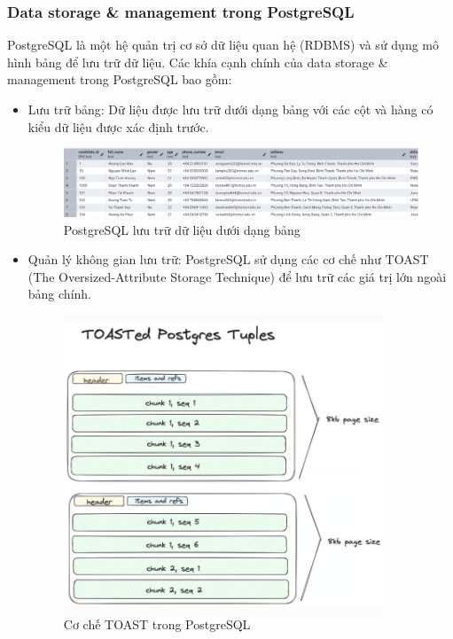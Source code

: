 \subsubsection{Data storage \& management trong PostgreSQL}
\indent PostgreSQL là một hệ quản trị cơ sở dữ liệu quan hệ (RDBMS) và sử dụng mô hình bảng để lưu trữ dữ liệu. Các khía cạnh chính của data storage \& management trong PostgreSQL bao gồm:
\begin{itemize}
    \item Lưu trữ bảng: Dữ liệu được lưu trữ dưới dạng bảng với các cột và hàng có kiểu dữ liệu được xác định trước. 
    \begin{figure}[H]
        \centering
        \includegraphics[width=\textwidth]{Image/2.1.2a.png}
        \caption{PostgreSQL lưu trữ dữ liệu dưới dạng bảng}
    \end{figure}
    \item Quản lý không gian lưu trữ: PostgreSQL sử dụng các cơ chế như TOAST (The Oversized-Attribute Storage Technique) để lưu trữ các giá trị lớn ngoài bảng chính.
    \begin{figure}[H]
        \centering
        \includegraphics[width=0.9\textwidth]{Image/TOAST.png}
        \caption{Cơ chế TOAST trong PostgreSQL}

\end{figure}
\end{itemize}
